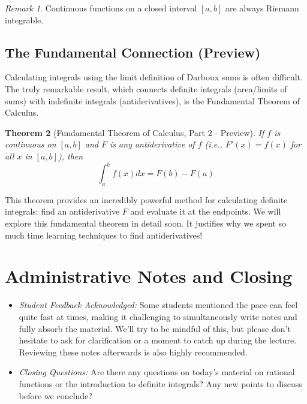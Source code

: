 \documentclass[11pt]{article}
\theoremstyle{plain}
\newtheorem{theorem}{Theorem}[section]
\theoremstyle{definition}
\theoremstyle{remark}
\newtheorem{remark}[theorem]{Remark}
\begin{document}
\begin{remark}
Continuous functions on a closed interval $[a,b]$ are always Riemann integrable.
\end{remark}

\subsection{The Fundamental Connection (Preview)}

Calculating integrals using the limit definition of Darboux sums is often difficult. The truly remarkable result, which connects definite integrals (area/limits of sums) with indefinite integrals (antiderivatives), is the Fundamental Theorem of Calculus.

\begin{theorem}[Fundamental Theorem of Calculus, Part 2 - Preview]
If $f$ is continuous on $[a,b]$ and $F$ is any antiderivative of $f$ (i.e., $F'(x) = f(x)$ for all $x$ in $[a,b]$), then
\[ \int_a^b f(x) dx = F(b) - F(a) \]
\end{theorem}

This theorem provides an incredibly powerful method for calculating definite integrals: find an antiderivative $F$ and evaluate it at the endpoints. We will explore this fundamental theorem in detail soon. It justifies why we spent so much time learning techniques to find antiderivatives!

\section*{Administrative Notes and Closing}

\begin{itemize}
    \item \textit{Student Feedback Acknowledged:} Some students mentioned the pace can feel quite fast at times, making it challenging to simultaneously write notes and fully absorb the material. We'll try to be mindful of this, but please don't hesitate to ask for clarification or a moment to catch up during the lecture. Reviewing these notes afterwards is also highly recommended.
    \item \textit{Closing Questions:} Are there any questions on today's material on rational functions or the introduction to definite integrals? Any new points to discuss before we conclude?
\end{itemize}
\end{document}
